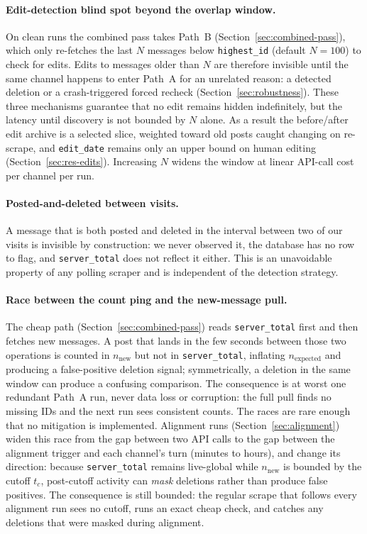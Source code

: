 \paragraph{Edit-detection blind spot beyond the overlap window.}
On clean runs the combined pass takes Path~B (Section~\ref{sec:combined-pass}), which only re-fetches the last $N$ messages below \texttt{highest\_id} (default $N=100$) to check for edits. Edits to messages older than $N$ are therefore invisible until the same channel happens to enter Path~A for an unrelated reason: a detected deletion or a crash-triggered forced recheck (Section~\ref{sec:robustness}). These three mechanisms guarantee that no edit remains hidden indefinitely, but the latency until discovery is not bounded by $N$ alone. As a result the before/after edit archive is a selected slice, weighted toward old posts caught changing on re-scrape, and \texttt{edit\_date} remains only an upper bound on human editing (Section~\ref{sec:res-edits}). Increasing $N$ widens the window at linear API-call cost per channel per run.

\paragraph{Posted-and-deleted between visits.}
A message that is both posted and deleted in the interval between two of our visits is invisible by construction: we never observed it, the database has no row to flag, and \texttt{server\_total} does not reflect it either. This is an unavoidable property of any polling scraper and is independent of the detection strategy.

\paragraph{Race between the count ping and the new-message pull.}
The cheap path (Section~\ref{sec:combined-pass}) reads \texttt{server\_total} first and then fetches new messages. A post that lands in the few seconds between those two operations is counted in $n_{\mathrm{new}}$ but not in \texttt{server\_total}, inflating $n_{\mathrm{expected}}$ and producing a false-positive deletion signal; symmetrically, a deletion in the same window can produce a confusing comparison. The consequence is at worst one redundant Path~A run, never data loss or corruption: the full pull finds no missing IDs and the next run sees consistent counts. The races are rare enough that no mitigation is implemented. Alignment runs (Section~\ref{sec:alignment}) widen this race from the gap between two API calls to the gap between the alignment trigger and each channel's turn (minutes to hours), and change its direction: because \texttt{server\_total} remains live-global while $n_{\mathrm{new}}$ is bounded by the cutoff $t_c$, post-cutoff activity can \emph{mask} deletions rather than produce false positives. The consequence is still bounded: the regular scrape that follows every alignment run sees no cutoff, runs an exact cheap check, and catches any deletions that were masked during alignment.


